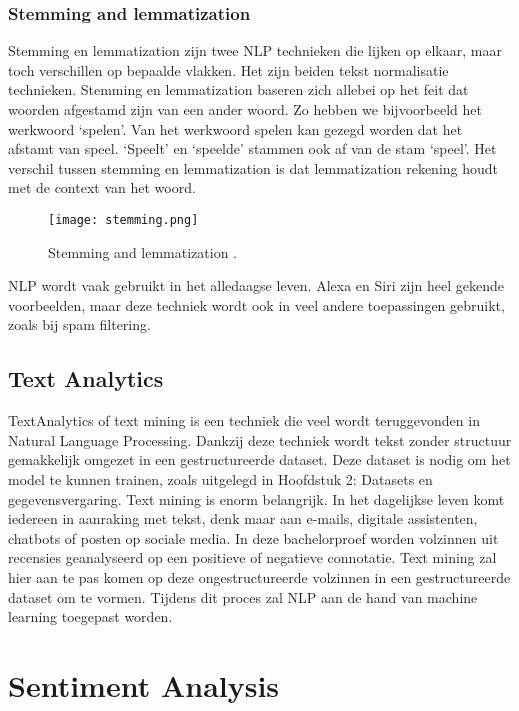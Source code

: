\subsubsection{Stemming and lemmatization}
\label{sec:stemming}

Stemming en lemmatization zijn twee NLP technieken die lijken op elkaar, maar toch verschillen op bepaalde vlakken. Het zijn beiden tekst normalisatie technieken. Stemming en lemmatization baseren zich allebei op het feit dat woorden afgestamd zijn van een ander woord. Zo hebben we bijvoorbeeld het werkwoord ‘spelen’. Van het werkwoord spelen kan gezegd worden dat het afstamt van speel. ‘Speelt’ en ‘speelde’ stammen ook af van de stam ‘speel’. Het verschil tussen stemming en lemmatization is dat lemmatization rekening houdt met de context van het woord. \autocite{sas2020}

\begin{figure}[!htbp]
    \texttt{[image: stemming.png]}
    \caption{\label{stemming}Stemming and lemmatization \autocite{sas2020}.}
\end{figure}
\FloatBarrier

NLP wordt vaak gebruikt in het alledaagse leven. Alexa en Siri zijn heel gekende voorbeelden, maar deze techniek wordt ook in veel andere toepassingen gebruikt, zoals bij spam filtering. 

\subsection{Text Analytics}
\label{sec:textanalytics}

\gls{TextAnalytics} of text mining is een techniek die veel wordt teruggevonden in Natural Language Processing. Dankzij deze techniek wordt tekst zonder structuur gemakkelijk omgezet in een gestructureerde dataset. \autocite{Linguamatics2021} Deze dataset is nodig om het model te kunnen trainen, zoals uitgelegd in Hoofdstuk 2: Datasets en gegevensvergaring.
Text mining is enorm belangrijk. In het dagelijkse leven komt iedereen in aanraking met tekst, denk maar aan e-mails, digitale assistenten, chatbots of posten op sociale media. In deze bachelorproef worden volzinnen uit recensies geanalyseerd op een positieve of negatieve connotatie. Text mining zal hier aan te pas komen op deze ongestructureerde volzinnen in een gestructureerde dataset om te vormen. Tijdens dit proces zal NLP aan de hand van machine learning toegepast worden. 

\section{Sentiment Analysis}
\label{sec:sentimentanalysis}

